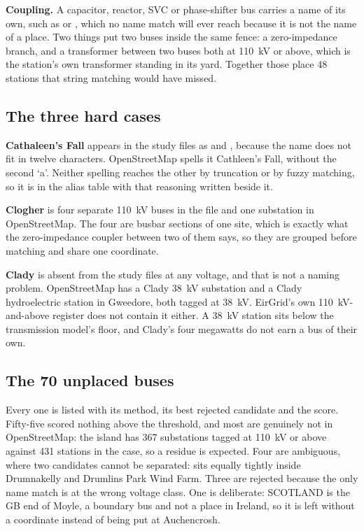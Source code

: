 \documentclass[11pt,a4paper]{article}
\begin{document}
\textbf{Coupling.} A capacitor, reactor, SVC or phase-shifter bus carries a
name of its own, such as  or , which no name
match will ever reach because it is not the name of a place. Two things put two
buses inside the same fence: a zero-impedance branch, and a transformer between
two buses both at 110~kV or above, which is the station's own transformer
standing in its yard. Together those place 48 stations that string matching
would have missed.

\subsection{The three hard cases}

\textbf{Cathaleen's Fall} appears in the study files as  and
, because the name does not fit in twelve characters.
OpenStreetMap spells it Cathleen's Fall, without the second `a'. Neither
spelling reaches the other by truncation or by fuzzy matching, so it is in the
alias table with that reasoning written beside it.

\textbf{Clogher} is four separate 110~kV buses in the file and one substation in
OpenStreetMap. The four are busbar sections of one site, which is exactly what
the zero-impedance coupler between two of them says, so they are grouped before
matching and share one coordinate.

\textbf{Clady} is absent from the study files at any voltage, and that is not a
naming problem. OpenStreetMap has a Clady 38~kV substation and a Clady
hydroelectric station in Gweedore, both tagged at 38~kV. EirGrid's own
110~kV-and-above register does not contain it either. A 38~kV station sits
below the transmission model's floor, and Clady's four megawatts do not earn a
bus of their own.

\subsection{The 70 unplaced buses}

Every one is listed with its method, its best rejected candidate and the score.
Fifty-five scored nothing above the threshold, and most are genuinely not in
OpenStreetMap: the island has 367 substations tagged at 110~kV or above against
431 stations in the case, so a residue is expected. Four are ambiguous, where
two candidates cannot be separated:  sits equally tightly inside
Drumnakelly and Drumlins Park Wind Farm. Three are rejected because the only
name match is at the wrong voltage class. One is deliberate: SCOTLAND is the GB
end of Moyle, a boundary bus and not a place in Ireland, so it is left without a
coordinate instead of being put at Auchencrosh.
\end{document}
